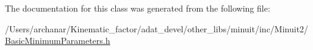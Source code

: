 The documentation for this class was generated from the following file\+:\begin{DoxyCompactItemize}
\item 
/\+Users/archanar/\+Kinematic\+\_\+factor/adat\+\_\+devel/other\+\_\+libs/minuit/inc/\+Minuit2/\mbox{\hyperlink{other__libs_2minuit_2inc_2Minuit2_2BasicMinimumParameters_8h}{Basic\+Minimum\+Parameters.\+h}}\end{DoxyCompactItemize}
